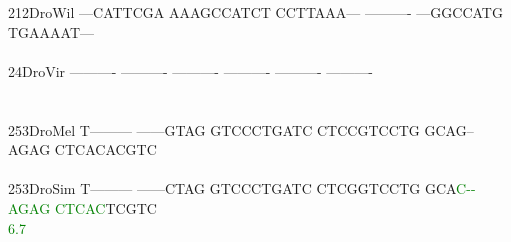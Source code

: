 \documentclass[11pt,twoside,reqno,a4paper]{article}
\begin{document}
{212\hspace*{1\charwidth}DroWil	---CATTCGA	AAAGCCATCT	CCTTAAA---	----------	---GGCCATG	TGAAAAT---	\\
\hspace*{4\charwidth}\hspace*{7\charwidth}\hspace*{1\charwidth}\hspace*{1\charwidth}\hspace*{1\charwidth}\hspace*{1\charwidth}\hspace*{1\charwidth}\hspace*{1\charwidth}\\
24\hspace*{2\charwidth}DroVir	----------	----------	----------	----------	----------	----------	\\
\hspace*{4\charwidth}\hspace*{7\charwidth}\hspace*{1\charwidth}\hspace*{1\charwidth}\hspace*{1\charwidth}\hspace*{1\charwidth}\hspace*{1\charwidth}\hspace*{1\charwidth}\\
\\
253\hspace*{1\charwidth}DroMel	T---------	------GTAG	GTCCCTGATC	CTCCGTCCTG	GCAG--AGAG	CTCACACGTC	\\
\hspace*{4\charwidth}\hspace*{7\charwidth}\hspace*{1\charwidth}\hspace*{1\charwidth}\hspace*{1\charwidth}\hspace*{1\charwidth}\hspace*{1\charwidth}\hspace*{1\charwidth}\\
253\hspace*{1\charwidth}DroSim	T---------	------CTAG	GTCCCTGATC	CTCGGTCCTG	GCA\textcolor{Green}{C}\textcolor{Green}{-}\textcolor{Green}{-}\textcolor{Green}{A}\textcolor{Green}{G}\textcolor{Green}{A}\textcolor{Green}{G}	\textcolor{Green}{C}\textcolor{Green}{T}\textcolor{Green}{C}\textcolor{Green}{A}\textcolor{Green}{C}TCGTC	\\
\hspace*{4\charwidth}\hspace*{7\charwidth}\hspace*{1\charwidth}\hspace*{1\charwidth}\hspace*{1\charwidth}\hspace*{1\charwidth}\hspace*{43\charwidth}\textcolor{Green}{6.7}\hspace*{1\charwidth}\hspace*{1\charwidth}\\
}
\end{document}

